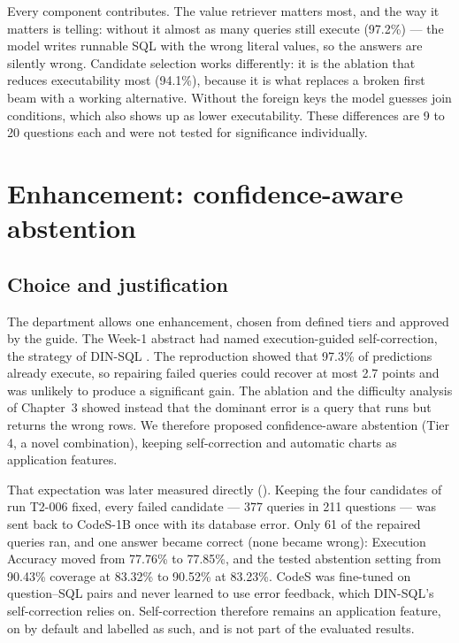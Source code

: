 Every component contributes. The value retriever matters most, and the way it matters is telling: without it almost as many queries still execute (97.2\%) --- the model writes runnable SQL with the wrong literal values, so the answers are silently wrong. Candidate selection works differently: it is the ablation that reduces executability most (94.1\%), because it is what replaces a broken first beam with a working alternative. Without the foreign keys the model guesses join conditions, which also shows up as lower executability. These differences are 9 to 20 questions each and were not tested for significance individually.

\section{Enhancement: confidence-aware abstention}

\subsection{Choice and justification}

The department allows one enhancement, chosen from defined tiers and approved by the guide. The Week-1 abstract had named execution-guided self-correction, the strategy of DIN-SQL \cite{pourreza2023dinsql}. The reproduction showed that 97.3\% of predictions already execute, so repairing failed queries could recover at most 2.7 points and was unlikely to produce a significant gain. The ablation and the difficulty analysis of Chapter~3 showed instead that the dominant error is a query that runs but returns the wrong rows. We therefore proposed confidence-aware abstention (Tier 4, a novel combination), keeping self-correction and automatic charts as application features.

That expectation was later measured directly (). Keeping the four candidates of run T2-006 fixed, every failed candidate --- 377 queries in 211 questions --- was sent back to CodeS-1B once with its database error. Only 61 of the repaired queries ran, and one answer became correct (none became wrong): Execution Accuracy moved from 77.76\% to 77.85\%, and the tested abstention setting from 90.43\% coverage at 83.32\% to 90.52\% at 83.23\%. CodeS was fine-tuned on question--SQL pairs and never learned to use error feedback, which DIN-SQL's self-correction relies on. Self-correction therefore remains an application feature, on by default and labelled as such, and is not part of the evaluated results.

